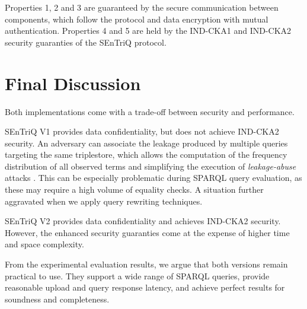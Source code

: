 Properties 1, 2 and 3 are guaranteed by the secure communication between components, which follow the  \autocite{noauthor_undated-yf} protocol and  \autocite{noauthor_undated-kt} data encryption with mutual authentication. Properties 4 and 5 are held by the \gls{IND-CKA1} and \gls{IND-CKA2} security guaranties of the \gls{SEnTriQ} protocol.

\section{Final Discussion}
\label{ch5:final-discussion}

Both implementations come with a trade-off between security and performance.

\gls{SEnTriQ} V1 provides data confidentiality, but does not achieve \gls{IND-CKA2} security. An adversary can associate the leakage produced by multiple queries targeting the same triplestore, which allows the computation of the frequency distribution of all observed terms and simplifying the execution of \emph{leakage-abuse} attacks \autocite{Jutla2021-af, Hahn2019-sg, Shafieinejad2021-rb}. This can be especially problematic during \gls{SPARQL} query evaluation, as these may require a high volume of equality checks. A situation further aggravated when we apply query rewriting techniques.

\gls{SEnTriQ} V2 provides data confidentiality and achieves \gls{IND-CKA2} security. However, the enhanced security guaranties come at the expense of higher time and space complexity.

From the experimental evaluation results, we argue that both versions remain practical to use. They support a wide range of \gls{SPARQL} queries, provide reasonable upload and query response latency, and achieve perfect results for soundness and completeness.